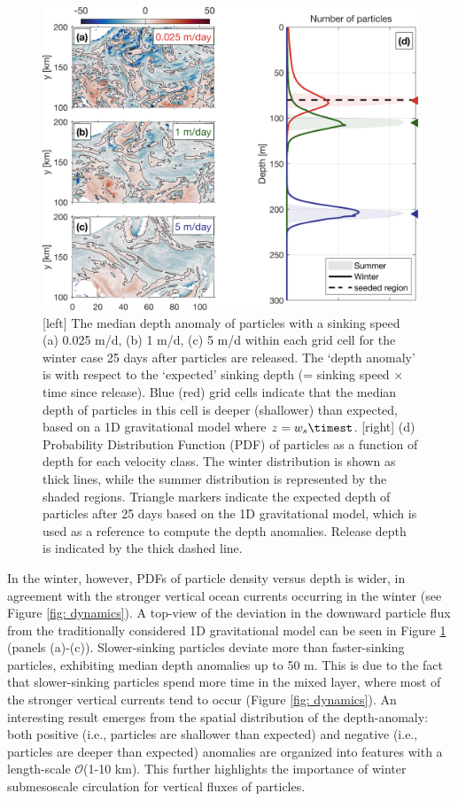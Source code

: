 \documentclass[article,linenumbers]{agujournal2018}
\begin{document}
\begin{figure}[ht!]
	\centering
	\includegraphics[width = .8\linewidth]{figures/Fig6.png}
	\caption{[left] 
	The median depth anomaly of particles with a sinking speed (a) 0.025 m/d, (b) 1 m/d, (c) 5 m/d within each grid cell for the winter case 25 days after particles are released. The `depth anomaly' is with respect to the `expected' sinking depth (= sinking speed $\times$ time since release).  
	Blue (red) grid cells indicate that the median depth of particles in this cell is deeper (shallower) than expected, based on a 1D gravitational model where $z = w_s\timest$. [right] (d) Probability Distribution Function (PDF) of particles as a function of depth for each velocity class. The winter distribution is shown as thick lines, while the summer distribution is represented by the shaded regions. Triangle markers indicate the expected depth of particles after 25 days based on the 1D gravitational model, which is used as a reference to compute the depth anomalies. Release depth is indicated by the thick dashed line.}	
	\label{fig: particle_depth_distribution}
\end{figure}

In the winter, however, PDFs of particle density versus depth is wider, in agreement with the stronger vertical ocean currents occurring in the winter (see Figure \ref{fig: dynamics}). A top-view of the deviation in the downward particle flux from the traditionally considered 1D gravitational model can be seen in Figure \ref{fig: particle_depth_distribution} (panels (a)-(c)). Slower-sinking particles deviate more than faster-sinking particles, exhibiting median depth anomalies up to 50 m. This is due to the fact that slower-sinking particles spend more time in the mixed layer, where most of the stronger vertical currents tend to occur (Figure \ref{fig: dynamics}). An interesting result emerges from the spatial distribution of the depth-anomaly: both positive (i.e., particles are shallower than expected) and negative (i.e., particles are deeper than expected) anomalies are organized into features with a length-scale $\mathcal{O}$(1-10 km). This further highlights the importance of winter submesoscale circulation for vertical fluxes of particles.
\end{document}
